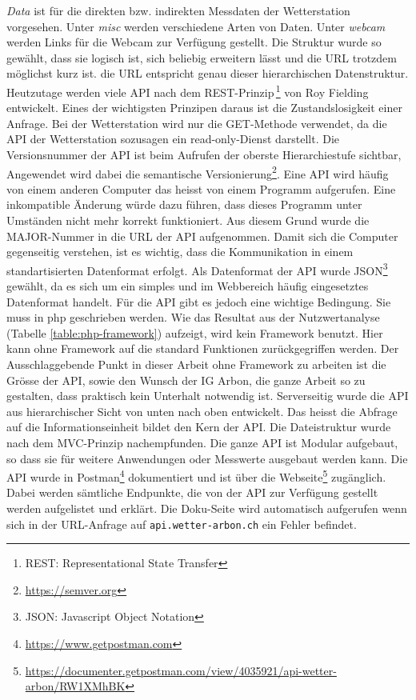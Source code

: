 \documentclass[11pt]{article}
\begin{document}
\begin{multicols}{2}
\emph{Data} ist für die direkten bzw. indirekten Messdaten der Wetterstation vorgesehen. Unter \emph{misc} werden verschiedene Arten von Daten. Unter \emph{webcam} werden Links für die Webcam zur Verfügung gestellt. Die Struktur wurde so gewählt, dass sie logisch ist, sich beliebig erweitern lässt und die URL trotzdem möglichst kurz ist. die URL entspricht genau dieser hierarchischen Datenstruktur. Heutzutage werden viele API nach dem REST-Prinzip\,\footnote{REST: Representational State Transfer} von Roy Fielding entwickelt. Eines der wichtigsten Prinzipen daraus ist die Zustandslosigkeit einer Anfrage. Bei der Wetterstation wird nur die GET-Methode verwendet, da die API der Wetterstation sozusagen ein read-only-Dienst darstellt. Die Versionsnummer der API ist beim Aufrufen der oberste Hierarchiestufe sichtbar, Angewendet wird dabei die semantische Versionierung\footnote{\url{https://semver.org}}.  Eine API wird häufig von einem anderen Computer das heisst von einem Programm aufgerufen. Eine inkompatible Änderung würde dazu führen, dass dieses Programm unter Umständen nicht mehr korrekt funktioniert. Aus diesem Grund wurde die MAJOR-Nummer in die URL der API aufgenommen. Damit sich die Computer gegenseitig verstehen, ist es wichtig, dass die Kommunikation in einem standartisierten Datenformat erfolgt. Als Datenformat der API wurde JSON\footnote{JSON: Javascript Object Notation} gewählt, da es sich um ein simples und im Webbereich häufig eingesetztes Datenformat handelt. Für die API gibt es jedoch eine wichtige Bedingung. Sie muss in php geschrieben werden. Wie das Resultat aus der Nutzwertanalyse (Tabelle \ref{table:php-framework}) aufzeigt, wird kein Framework benutzt. Hier kann ohne Framework auf die standard Funktionen zurückgegriffen werden. Der Ausschlaggebende Punkt in dieser Arbeit ohne Framework zu arbeiten ist die Grösse der API, sowie den Wunsch der IG Arbon, die ganze Arbeit so zu gestalten, dass praktisch kein Unterhalt notwendig ist. Serverseitig wurde die API aus hierarchischer Sicht von unten nach oben entwickelt. Das heisst die Abfrage auf die Informationseinheit bildet den Kern der API. Die Dateistruktur wurde nach dem MVC-Prinzip nachempfunden. Die ganze API ist Modular aufgebaut, so dass sie für weitere Anwendungen oder Messwerte ausgebaut werden kann. Die API wurde in Postman\footnote{\url{https://www.getpostman.com}} dokumentiert und ist über die Webseite\footnote{\url{https://documenter.getpostman.com/view/4035921/api-wetter-arbon/RW1XMhBK}} zugänglich.  Dabei werden sämtliche Endpunkte, die von der API zur Verfügung gestellt werden aufgelistet und erklärt. Die Doku-Seite wird automatisch aufgerufen wenn sich in der URL-Anfrage auf \texttt{api.wetter-arbon.ch} ein Fehler befindet.


\end{multicols}
\end{document}
